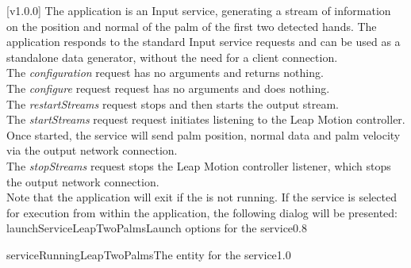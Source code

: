 [v1.0.0]
The  application is an Input service,
generating a stream of information on the position and normal of the palm of the first two
detected hands.
The application responds to the standard Input service requests and can be used as a
standalone data generator, without the need for a client connection.\\

The \emph{configuration} request has no arguments and returns nothing.\\

The \emph{configure} request request has no arguments and does nothing.\\

The \emph{restartStreams} request stops and then starts the output stream.\\

The \emph{startStreams} request request initiates listening to the Leap Motion controller.
Once started, the service will send palm position, normal data and palm velocity via the
output \yarp{} network connection.\\

The \emph{stopStreams} request stops the Leap Motion controller listener, which stops the
output \yarp{} network connection.\\ 

Note that the application will exit if the \emph{\RS} is not running.
\insertAppParameters
\insertTagDescription{\LTPI}
\insertInputServiceComment
\condPage
\insertStandardServiceCommands
\secondaryEnd
\condPage
{}
If the service is selected for execution from within the \emph{\MMMU} application, the
following dialog will be presented:
%
{launchServiceLeapTwoPalms}{Launch options for the \emph{\LTPI} service}{0.8}

%
{serviceRunningLeapTwoPalms}{The \emph{\MMMU} entity for the \emph{\LTPI} service}{1.0}
\secondaryEnd
\primaryEnd{}
